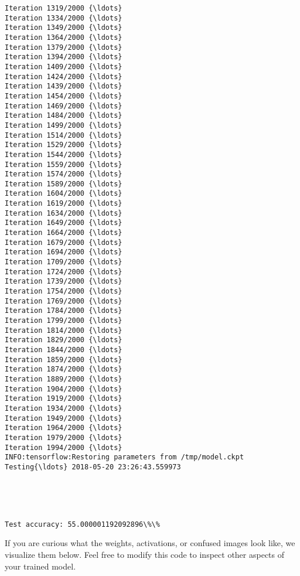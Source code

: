 \documentclass[11pt]{article}
\begin{document}
\begin{Verbatim}[commandchars=\\\{\}]
Iteration 1319/2000 {\ldots}
Iteration 1334/2000 {\ldots}
Iteration 1349/2000 {\ldots}
Iteration 1364/2000 {\ldots}
Iteration 1379/2000 {\ldots}
Iteration 1394/2000 {\ldots}
Iteration 1409/2000 {\ldots}
Iteration 1424/2000 {\ldots}
Iteration 1439/2000 {\ldots}
Iteration 1454/2000 {\ldots}
Iteration 1469/2000 {\ldots}
Iteration 1484/2000 {\ldots}
Iteration 1499/2000 {\ldots}
Iteration 1514/2000 {\ldots}
Iteration 1529/2000 {\ldots}
Iteration 1544/2000 {\ldots}
Iteration 1559/2000 {\ldots}
Iteration 1574/2000 {\ldots}
Iteration 1589/2000 {\ldots}
Iteration 1604/2000 {\ldots}
Iteration 1619/2000 {\ldots}
Iteration 1634/2000 {\ldots}
Iteration 1649/2000 {\ldots}
Iteration 1664/2000 {\ldots}
Iteration 1679/2000 {\ldots}
Iteration 1694/2000 {\ldots}
Iteration 1709/2000 {\ldots}
Iteration 1724/2000 {\ldots}
Iteration 1739/2000 {\ldots}
Iteration 1754/2000 {\ldots}
Iteration 1769/2000 {\ldots}
Iteration 1784/2000 {\ldots}
Iteration 1799/2000 {\ldots}
Iteration 1814/2000 {\ldots}
Iteration 1829/2000 {\ldots}
Iteration 1844/2000 {\ldots}
Iteration 1859/2000 {\ldots}
Iteration 1874/2000 {\ldots}
Iteration 1889/2000 {\ldots}
Iteration 1904/2000 {\ldots}
Iteration 1919/2000 {\ldots}
Iteration 1934/2000 {\ldots}
Iteration 1949/2000 {\ldots}
Iteration 1964/2000 {\ldots}
Iteration 1979/2000 {\ldots}
Iteration 1994/2000 {\ldots}
INFO:tensorflow:Restoring parameters from /tmp/model.ckpt
Testing{\ldots} 2018-05-20 23:26:43.559973

    \end{Verbatim}

    \begin{center}
    \end{center}
    { \hspace*{\fill} \\}
    
    \begin{center}
    \end{center}
    { \hspace*{\fill} \\}
    
    \begin{Verbatim}[commandchars=\\\{\}]
Test accuracy: 55.000001192092896\%\%

    \end{Verbatim}

    If you are curious what the weights, activations, or confused images
look like, we visualize them below. Feel free to modify this code to
inspect other aspects of your trained model.
\end{document}
